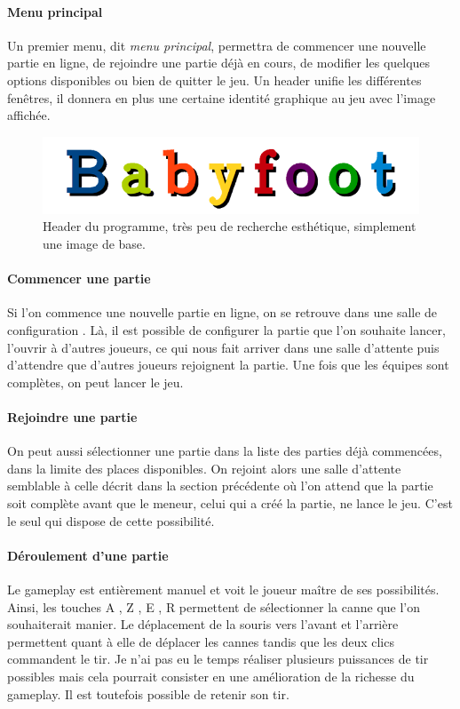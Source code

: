 \documentclass[a4paper,12pt]{report}
\begin{document}
\paragraph{Menu principal}
Un premier menu, dit \emph{menu principal}, permettra de commencer une nouvelle partie en ligne, de rejoindre une partie
déjà en cours, de modifier les quelques options disponibles ou bien de quitter le jeu. Un header unifie les différentes fenêtres, il donnera en plus une certaine identité graphique au jeu avec l'image affichée.
    
    \begin{figure}[H]
	\begin{center}
	\includegraphics[width=17cm]{pictures/header.png} 
	\end{center}
	\caption{Header du programme, très peu de recherche esthétique, simplement une image de base.}
    \end{figure}
\paragraph{Commencer une partie}
Si l'on commence une nouvelle partie en ligne, on se retrouve dans une \og salle de configuration \fg. Là, il est possible de configurer la partie que l'on souhaite lancer, l'ouvrir à d'autres joueurs, ce qui nous fait arriver dans une \og salle d'attente \fg puis d'attendre que d'autres joueurs rejoignent la partie. Une fois que les équipes sont complètes, on peut lancer le jeu.
\paragraph{Rejoindre une partie}
On peut aussi sélectionner une partie dans la liste des parties déjà commencées, dans la limite des places disponibles. On rejoint alors une \og salle d'attente \fg semblable à celle décrit dans la section précédente où l'on attend que la partie soit complète avant que le meneur, celui qui a créé la partie, ne lance le jeu. C'est le seul qui dispose de cette possibilité.
\paragraph{Déroulement d'une partie}
Le gameplay est entièrement manuel et voit le joueur maître de ses possibilités. Ainsi, les touches \og A \fg, \og Z \fg, \og E \fg, \og R \fg permettent de sélectionner la canne que l'on souhaiterait manier. Le déplacement de la souris vers l'avant et l'arrière permettent quant à elle de déplacer les cannes tandis que les deux clics commandent le tir. Je n'ai pas eu le temps réaliser plusieurs puissances de tir possibles mais cela pourrait consister en une amélioration de la richesse du gameplay. Il est toutefois possible de retenir son tir.
\end{document}
